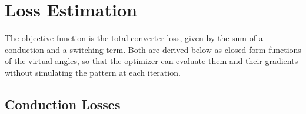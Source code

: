 \documentclass[conference]{IEEEtran}
\begin{document}
\section{Loss Estimation}
\label{sec:perdidas}

The objective function is the total converter loss, given by the sum of a conduction and a switching term. Both are derived below as closed-form functions
of the virtual angles, so that the optimizer can evaluate them and their
gradients without simulating the pattern at each iteration.

\subsection{Conduction Losses}
\end{document}
